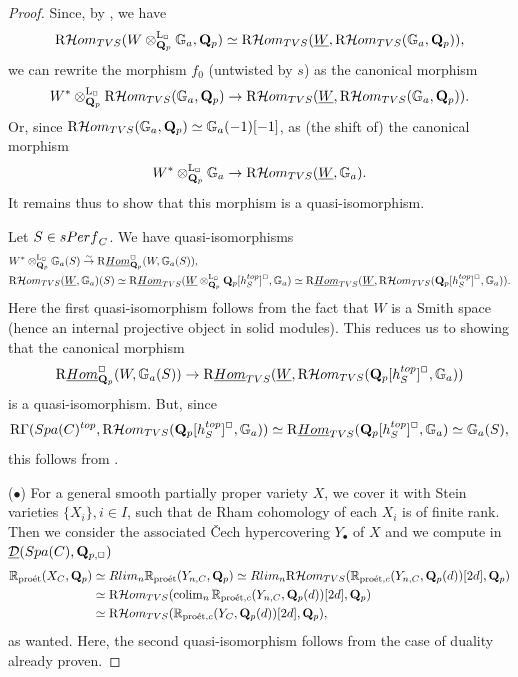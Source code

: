 \documentclass[10pt,reqno]{amsart}
\let\cal\mathcal
\theoremstyle{definition}
\theoremstyle{remark}
\def\jcdot{\scriptscriptstyle\bullet}
\newcommand{\colim}{\operatorname{colim} }
\newcommand{\proeet}{\operatorname{pro\acute{e}t} }
\newcommand{\uHom}{\underline{{\rm{Hom}} }}
\newcommand{\Hhom}{{\cal Hom}}
\newcommand{\LL}{\operatorname{L} }
\newcommand{\sd}{{\mathcal{D}}}
\numberwithin{equation}{section}
\def\R{{\mathrm R}}
\def\Q{{\bf Q}} \def\Z{{\bf Z}}
\numberwithin{equation}{section}
\begin{document}
\begin{proof}
        Since, by \cite[Lemma 3.27]{TVS},  we have 
      $$
       \R\Hhom_{\rm TVS}(W\otimes^{\LL_{\Box}}_{\Q_{p}}{\mathbb G}_a,\Q_p) \simeq  \R\Hhom_{\rm TVS}(\underline{W},\R\Hhom_{\rm TVS}({\mathbb G}_a,\Q_p)),
      $$
      we can rewrite the morphism $f_0$ (untwisted by $s$) as the canonical morphism 
      $$
      W^*\otimes^{\LL_{\Box}}_{\Q_{p}} \R\Hhom_{\rm TVS}({\mathbb G}_a,\Q_p)\to \R\Hhom_{\rm TVS}(\underline{W},\R\Hhom_{\rm TVS}({\mathbb G}_a,\Q_p)).
      $$
      Or, since $\R\Hhom_{\rm TVS}({\mathbb G}_a,\Q_p)\simeq {\mathbb G}_a(-1)[-1]$, as (the shift of)  the canonical morphism
      $$
            W^*\otimes^{\LL_{\Box}}_{\Q_{p}} {\mathbb G}_a\to \R\Hhom_{\rm TVS}(\underline{W},{\mathbb G}_a).
 $$
 It remains thus to show that this morphism is a quasi-isomorphism. 
 
     Let $S\in {\rm sPerf}_C$.     We have quasi-isomorphisms 
 \begin{align*} & W^*\otimes^{\LL_{\Box}}_{\Q_{p}}{\mathbb G}_a(S)\stackrel{\sim}{\to} \R\uHom^{\Box}_{\Q_p}({W},{\mathbb G}_a(S)),\\
 &\R\Hhom_{\rm TVS}(\underline{W},{\mathbb G}_a)(S)\simeq \R\uHom_{\rm TVS}(\underline{W}\otimes^{\LL_{\Box}}_{\Q_{p}}\Q_p[h^{\rm top}_S]^{\Box},{\mathbb G}_a)
  \simeq  \R\uHom_{\rm TVS}(\underline{W},\R\Hhom_{\rm TVS}(\Q_p[h^{\rm top}_S]^{\Box}, {\mathbb G}_a)).
  \end{align*}
Here  the first quasi-isomorphism follows 
  from  the fact that $W$ is a Smith space (hence an internal projective object in solid modules). This reduces us to showing that the canonical morphism
  $$
  \R\uHom^{\Box}_{\Q_p}({W},{\mathbb G}_a(S))\to \R\uHom_{\rm TVS}(\underline{W},\R\Hhom_{\rm TVS}(\Q_p[h^{\rm top}_S]^{\Box}, {\mathbb G}_a))
  $$
  is a quasi-isomorphism. But, since
  $$\R\Gamma({\rm Spa}(C)^{\rm top}, \R\Hhom_{\rm TVS}(\Q_p[h^{\rm top}_S]^{\Box}, {\mathbb G}_a))\simeq \R\uHom_{\rm TVS}(\Q_p[h^{\rm top}_S]^{\Box}, {\mathbb G}_a)\simeq {\mathbb G}_a(S),
  $$ this follows from 
  \cite[Lemma 3.27]{TVS}. 
  
   \vskip2mm 
    ($\bullet$)  For a general smooth partially proper variety $X$,  we cover it with Stein varieties $\{X_i\}, i\in I$, such that de Rham cohomology of each $X_i$ is of finite rank. Then
    we consider the associated \v{C}ech hypercovering $Y_{\jcdot}$ of $X$ and we compute in $\underline{\sd}({\rm Spa}(C),\Q_{p,\Box})$
   \begin{align*}
{\mathbb R}_{\proeet}(X_C,\Q_p)& \simeq{\rm Rlim}_{n} {\mathbb R}_{\proeet}(Y_{n,C},\Q_p)\simeq{\rm Rlim}_{n}\R\Hhom_{\rm TVS}({\mathbb R}_{\proeet,c}(Y_{n,C},\Q_p(d))[2d],\Q_p)\\
& \simeq\R\Hhom_{\rm TVS}(\colim_{n}{\mathbb R}_{\proeet,c}(Y_{n,C},\Q_p(d))[2d],\Q_p)\\
 & \simeq\R\Hhom_{\rm TVS}({\mathbb R}_{\proeet,c}(Y_C,\Q_p(d))[2d],\Q_p),
   \end{align*}
as wanted. Here, the second quasi-isomorphism follows from the case of  duality already proven.
\end{proof}
\end{document}
